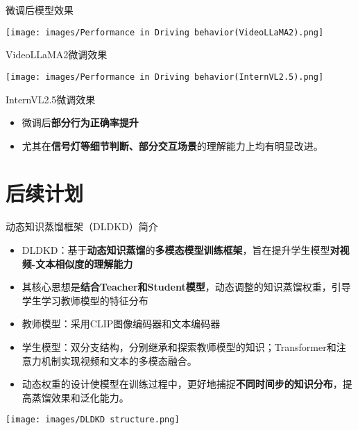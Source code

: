 \documentclass[serif]{beamer}
\begin{document}
\begin{frame}{微调后模型效果}

\noindent
\begin{minipage}[t]{0.48\textwidth}
  \centering
  \texttt{[image: images/Performance in Driving behavior(VideoLLaMA2).png]}
  \caption{VideoLLaMA2微调效果}
\end{minipage}
\hfill
\begin{minipage}[t]{0.48\textwidth}
  \centering
  \texttt{[image: images/Performance in Driving behavior(InternVL2.5).png]}
  \caption{InternVL2.5微调效果}
\end{minipage}

\vspace{1em}

\begin{itemize}
    \item 微调后\textbf{部分行为正确率提升}
    \item 尤其在\textbf{信号灯等细节判断、部分交互场景}的理解能力上均有明显改进。
\end{itemize}

\end{frame}

\section{后续计划}

\begin{frame}{动态知识蒸馏框架（DLDKD）简介}

\scriptsize
\begin{itemize}
  \item DLDKD：基于\textbf{动态知识蒸馏}的\textbf{多模态模型训练框架}，旨在提升学生模型\textbf{对视频-文本相似度的理解能力}
  \item 其核心思想是\textbf{结合Teacher和Student模型}，动态调整的知识蒸馏权重，引导学生学习教师模型的特征分布
  \item 教师模型：采用CLIP图像编码器和文本编码器
  \item 学生模型：双分支结构，分别继承和探索教师模型的知识；Transformer和注意力机制实现视频和文本的多模态融合。
  \item 动态权重的设计使模型在训练过程中，更好地捕捉\textbf{不同时间步的知识分布}，提高蒸馏效果和泛化能力。
\end{itemize}

\normalsize
\centering
\texttt{[image: images/DLDKD structure.png]}
\end{frame}
\end{document}
